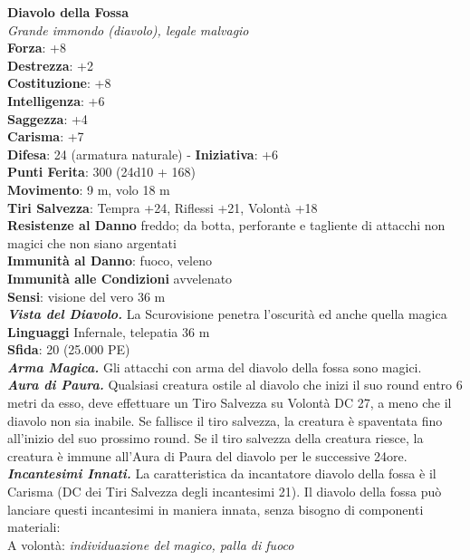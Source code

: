 \begin{multicols}{2}
\medskip\textbf{Diavolo della Fossa}\\
\emph{Grande immondo (diavolo), legale malvagio}\\
\textbf{Forza}: +8\\
\textbf{Destrezza}: +2\\
\textbf{Costituzione}: +8\\
\textbf{Intelligenza}: +6\\
\textbf{Saggezza}: +4\\
\textbf{Carisma}: +7\\
\textbf{Difesa}: 24 (armatura naturale) - \textbf{Iniziativa}: +6\\
\textbf{Punti Ferita}: 300 (24d10 + 168)\\
\textbf{Movimento}: 9 m, volo 18 m\\
\textbf{Tiri Salvezza}: Tempra +24, Riflessi +21, Volontà +18\\
\textbf{Resistenze al Danno} freddo; da botta, perforante e tagliente di attacchi non magici che non siano argentati\\
\textbf{Immunità al Danno}: fuoco, veleno\\
\textbf{Immunità alle Condizioni} avvelenato\\
\textbf{Sensi}: visione del vero 36 m\\
\emph{\textbf{Vista del Diavolo.}} La Scurovisione penetra l'oscurità ed anche quella magica\\
\textbf{Linguaggi} Infernale, telepatia 36 m\\ 
\textbf{Sfida}: 20 (25.000 PE)\smallskip\\
\emph{\textbf{Arma Magica.}} Gli attacchi con arma del diavolo della fossa sono magici.\\
\emph{\textbf{Aura di Paura.}} Qualsiasi creatura ostile al diavolo che inizi il suo round entro 6 metri da esso, deve effettuare un Tiro Salvezza su Volontà DC  27, a meno che il diavolo non sia inabile. Se fallisce il tiro salvezza, la creatura è spaventata fino all'inizio del suo prossimo round. Se il tiro salvezza della creatura riesce, la creatura è immune all'Aura di Paura del diavolo per le successive 24ore. \\
\emph{\textbf{Incantesimi Innati.}} La caratteristica da incantatore diavolo della fossa è il Carisma (DC dei Tiri Salvezza degli incantesimi 21). Il diavolo della fossa può lanciare questi incantesimi in maniera innata, senza bisogno di componenti materiali:\\
A volontà: \emph{individuazione del magico, palla di fuoco}\\

\end{multicols}
